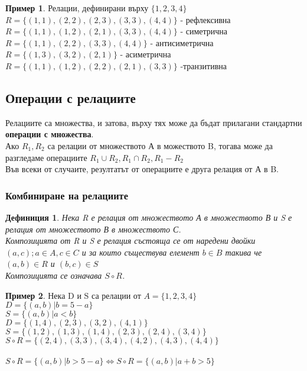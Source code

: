\documentclass[fleqn, 12pt]{article}
\newtheorem{definition}{Дефиниция}[subsection]
\theoremstyle{definition}
\newtheorem{example}{Пример}[subsection]
\begin{document}
\begin{example}
Релации, дефинирани върху $\{1, 2, 3, 4 \}$ \\
$R = \{ (1, 1), (2, 2), (2, 3), (3, 3), (4, 4) \}$ - рефлексивна \\
$R = \{(1, 1), (1, 2), (2, 1), (3, 3), (4, 4) \}$  - симетрична \\
$R = \{(1, 1), (2, 2), (3, 3), (4, 4) \}$ - антисиметрична \\
$R = \{(1, 3), (3, 2), (2, 1) \}$ - асиметрична \\
$R = \{(1, 1), (1, 2), (2, 2), (2, 1), (3, 3)\}$ -транзитивна\\
\end{example}

\subsection{Операции с релациите}
Релациите са множества, и затова, върху тях може да бъдат прилагани стандартни \textbf{операции с множества}. \\
Ако $R_1, R_2$ са релации от множеството А в можеството B, тогава може да разгледаме операциите $R_1 \cup R_2, R_1 \cap R_2, R_1 - R_2$ \\
Във всеки от случаите, резултатът от операциите е друга релация от А в B. \\

\subsubsection{Комбиниране на релациите}

\begin{definition}
Нека R е релация от множеството А в множеството В и S е релация от множеството В в множеството С. \\
Композицията от R и S е релация състояща се от наредени двойки $(a,c); a \in A, c \in C$ и за които съществува елемент $ b \in B$ такива че $(a, b) \in R$ и $(b,c) \in S$ \\
Композицията се означава $S \circ R$.
\end{definition}

\begin{example}
Нека D и S са релации от $A = \{1, 2, 3, 4 \}$ \\
$D = \{ (a,b) | b = 5-a \}$ \\
$S = \{ (a,b) | a < b\}$\\
$D = \{(1, 4), (2, 3), (3, 2), (4, 1) \}$ \\
$S = \{ (1, 2), (1, 3), (1, 4), (2, 3), (2, 4), (3, 4) \}$\\
$S \circ R = \{ (2, 4), (3, 3), (3, 4), (4, 2), (4, 3), (4, 4) \}$\\
\\
$S \circ R =  \{ (a,b) | b > 5-a \} \Leftrightarrow S \circ R =  \{ (a,b) | a + b > 5 \}$
\end{example}
\end{document}
